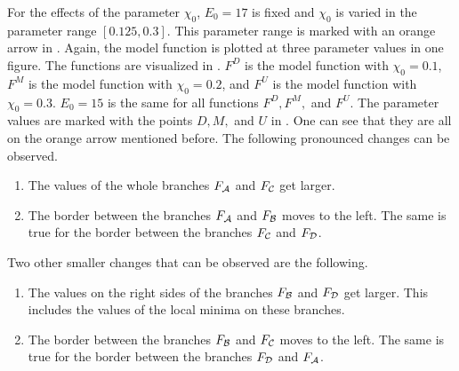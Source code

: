 For the effects of the parameter $\chi_0$, $E_0 = 17$ is fixed and $\chi_0$ is varied in the parameter range $[0.125, 0.3]$.
This parameter range is marked with an orange arrow in .
Again, the model function is plotted at three parameter values in one figure.
The functions are visualized in .
$F^D$ is the model function with $\chi_0 = 0.1$, $F^M$ is the model function with $\chi_0 = 0.2$, and $F^U$ is the model function with $\chi_0 = 0.3$.
$E_0 = 15$ is the same for all functions $F^D, F^M,$ and $F^U$.
The parameter values are marked with the points $D, M,$ and $U$ in .
One can see that they are all on the orange arrow mentioned before.
The following pronounced changes can be observed.
\begin{enumerate}
	\item The values of the whole branches $F_{\mathcal{A}}$ and $F_{\mathcal{C}}$ get larger.
	\item The border between the branches $F_{\mathcal{A}}$ and $F_{\mathcal{B}}$ moves to the left.
	      The same is true for the border between the branches $F_{\mathcal{C}}$ and $F_{\mathcal{D}}$.
\end{enumerate}
Two other smaller changes that can be observed are the following.
\begin{enumerate}
	\item The values on the right sides of the branches $F_{\mathcal{B}}$ and $F_{\mathcal{D}}$ get larger.
	      This includes the values of the local minima on these branches.
	\item The border between the branches $F_{\mathcal{B}}$ and $F_{\mathcal{C}}$ moves to the left.
	      The same is true for the border between the branches $F_{\mathcal{D}}$ and $F_{\mathcal{A}}$.
\end{enumerate}

